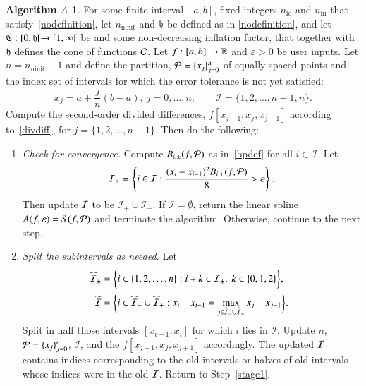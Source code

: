 \documentclass[review]{elsarticle}
\newcommand{\abstol}{\varepsilon}
\theoremstyle{definition}
\newtheorem*{algoA}{Algorithm $A$}
\DeclareMathOperator{\lo}{lo}
\DeclareMathOperator{\ninit}{ninit}
\begin{document}
\begin{algoA} \label{AlgoA}
For some finite interval $[a,b]$, fixed integers $n_{\lo}$ and $n_{\text{hi}}$ that satisfy~\eqref{nodefinition}, let $n_{\ninit}$ and $\mathfrak{h}$ be defined as in \eqref{nodefinition}, and let  $\mathfrak{C}:[0,\mathfrak{h}[ \to [1, \infty[$ be and some non-decreasing inflation factor, that together with $\mathfrak{h}$ defines the cone of functions $\mathcal{C}$.  Let $f:[a,b] \to \mathbb{R}$ and $\abstol >0$ be
user inputs.  Let  $n=n_{\ninit}-1$ and define the partition, $\mathcal{P} = \{x_j\}_{j=0}^n$ of  equally spaced points and the index set of intervals for which the error tolerance
is not yet satisfied:
$$x_j=a+\frac{j}{n}(b-a), \ j=0,\ldots,n, \qquad
\mathcal{I} = \{1,2,\ldots,n-1,n\}.$$
Compute the second-order divided differences, $f[x_{j-1},
x_{j}, x_{j+1}]$ according to~\ref{divdiff}, for $j= \{1,2,\ldots,n-1\}$. Then do the
following:
\begin{enumerate}[\em Step 1.]%

\item \label{stage1} \emph{Check for convergence.}
Compute $B_{i,\pm}(f,\mathcal{P})$ as in~\eqref{bpdef} for all $i \in \mathcal{I}$.
Let
\[
\mathcal{I}_\pm = \left\{i \in \mathcal{I}: \frac{(x_i - x_{i-1})^2B_{i,\pm}(f,\cp)}{8}  > \abstol \right\}.
\]
Then update $\mathcal{I}$ to be $\mathcal{I}_+ \cup \mathcal{I}_-$.  If $\mathcal{I} = \emptyset$, return the linear spline $A(f,\abstol) = S(f, \cp)$ and terminate the algorithm.
Otherwise, continue to the next step.

\item \label{stage2} \emph{Split the subintervals as needed.}
Let
\begin{gather*}
\widehat{\mathcal{I}}_{\pm} = \biggl\{i \in \{1,2,\ldots,n\}: i\mp k \in \mathcal{I}_{\pm}, \ k \in \{0,1,2\}   \biggr\}, \quad  \\
\widetilde{\mathcal{I}}=\biggl\{i \in \widehat{\mathcal{I}}_- \cup \widehat{\mathcal{I}}_+ : x_i - x_{i-1}=\max\limits_{j \in \widehat{\mathcal{I}}_- \cup \widehat{\mathcal{I}}_+ } x_j-x_{j-1} \biggr\}.
\end{gather*}
Split in half those intervals $[x_{i-1},x_i]$ for which $i$ lies in $\widetilde{\mathcal{I}}$.
Update $n$, $\mathcal{P} = \{x_j\}_{j=0}^n$, $\mathcal{I}$, and the $f[x_{j-1}, x_{j}, x_{j+1}]$ accordingly.  The updated $\mathcal{I}$ contains  indices corresponding to the old intervals or halves of old intervals whose indices were in the old $\mathcal{I}$.  Return to Step~\ref{stage1}.
\end{enumerate}
\end{algoA}
\end{document}
